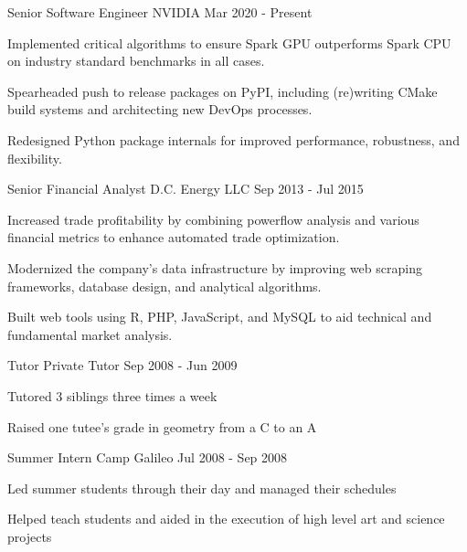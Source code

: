 \begin{cventries}
  \cventry
    {Senior Software Engineer} %
    {NVIDIA} %
    {} %
    {Mar 2020 - Present} %
{
      \begin{cvitems} %
        \item Implemented critical algorithms to ensure Spark GPU outperforms Spark CPU on industry standard benchmarks in all cases.
        \item Spearheaded push to release packages on PyPI, including (re)writing CMake build systems and architecting new DevOps processes.
        \item Redesigned Python package internals for improved performance, robustness, and flexibility.
      \end{cvitems}
    }
  \cventry
    {Senior Financial Analyst} %
    {D.C. Energy LLC} %
    {} %
    {Sep 2013 - Jul 2015} %
{
      \begin{cvitems} %
        \item Increased trade profitability by combining powerflow analysis and various financial metrics to enhance automated trade optimization.
        \item Modernized the company's data infrastructure by improving web scraping frameworks, database design, and analytical algorithms.
        \item Built web tools using R, PHP, JavaScript, and MySQL to aid technical and fundamental market analysis.
      \end{cvitems}
    }
  \cventry
    {Tutor} %
    {Private Tutor} %
    {} %
    {Sep 2008 - Jun 2009} %
{
      \begin{cvitems} %
        \item Tutored 3 siblings three times a week
        \item Raised one tutee's grade in geometry from a C to an A
      \end{cvitems}
    }
  \cventry
    {Summer Intern} %
    {Camp Galileo} %
    {} %
    {Jul 2008 - Sep 2008} %
{
      \begin{cvitems} %
        \item Led summer students through their day and managed their schedules
        \item Helped teach students and aided in the execution of high level art and science projects
      \end{cvitems}
    }
\end{cventries}